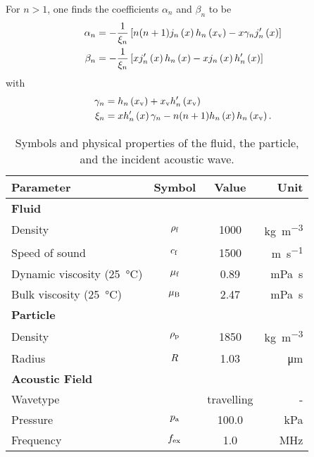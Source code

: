 For $n > 1$, one finds the coefficients $\alpha_{n}$ and $\beta_{n}$ to be
\begin{subequations}
\begin{align}
  \alpha_{n} & =
  - \frac{1}{\xi_{n}} \left[
    n(n+1)j_{n}\left(x\right)h_{n}\left(x_{\mathrm{v}}\right) - x \gamma_{n}j^{\prime}_{n}\left(x\right)
  \right]
  \label{eq:TA-alpha-n}\\
    \beta_{n} &= - \frac{1}{\xi_{n}} \left[
      xj^{\prime}_{n}\left(x\right)h_{n}\left(x\right) - xj_{n}\left(x\right)h^{\prime}_{n}\left(x\right)
    \right]
    \label{eq:TA-beta-n}
\end{align}
\end{subequations}
with
\begin{subequations}
\begin{align}
  \gamma_{n} & =
  h_{n}\left(x_{\mathrm{v}}\right)+x_{\mathrm{v}}h^{\prime}_{n}\left(x_{\mathrm{v}}\right)
  \label{eq:TA-gamma-n}\\
  \xi_{n} &= xh^{\prime}_{n}\left(x\right)\gamma_{n} - n(n+1)h_{n}\left(x\right)h_{n}\left(x_{\mathrm{v}}\right).
    \label{eq:TA-xi-n}
\end{align}
\end{subequations}

\begin{table}
  \centering
  \begin{tabular}{lccr}
    \toprule
    \toprule
    {\bfseries Parameter} & {\bfseries Symbol} & {\bfseries Value} & {\bfseries 
    Unit}\\
    \midrule
    \textbf{Fluid} & & \\
    Density & $\rho_{\mathrm{f}}$ & 1000 & \si{\kg\per\cubic\meter} \\
    Speed of sound & $c_{\mathrm{f}}$ & 1500 & \si{\m\per\s} \\
    Dynamic viscosity (\SI{25}{\degreeCelsius}) & $\mu_{\mathrm{f}}$ & 0.89 & 
    \si{\milli\pascal\second} \\
    Bulk viscosity (\SI{25}{\degreeCelsius}) & $\mu_{\mathrm{B}}$ & 2.47 & 
    \si{\milli\pascal\second} \\
    \midrule
    \textbf{Particle} & & \\
    Density & $\rho_{\mathrm{p}}$ & 1850 & \si{\kg\per\cubic\meter} \\
    Radius & $R$& 1.03 & \si{\um}\\
    \midrule
    \textbf{Acoustic Field} & & \\
    Wavetype &  & travelling & - \\
    Pressure & $p_{\mathrm{a}}$ & 100.0 & \si{\kilo\pascal} \\
    Frequency & $f_{\mathrm{ex}}$ & 1.0 & \si{\MHz} \\
    \bottomrule
    \bottomrule
  \end{tabular}
  \caption{Symbols and physical properties of the fluid, the particle, and the 
  incident acoustic wave.}\label{tab:TA-parameters}
\end{table}

